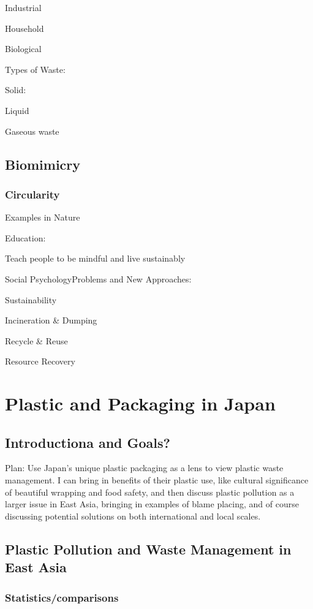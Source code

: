 \documentclass{book}\usepackage{knitr}
\begin{document}
Industrial

Household

Biological 

Types of Waste:

Solid:

Liquid

Gaseous waste

\section{Biomimicry}

\subsection{Circularity}

Examples in Nature

Education:

Teach people to be mindful and live sustainably

Social PsychologyProblems and New Approaches: 

Sustainability

Incineration \& Dumping

Recycle \& Reuse

Resource Recovery


\chapter{Plastic and Packaging in Japan}

\section{Introductiona and Goals?}

Plan: Use Japan's unique plastic packaging as a lens to view plastic waste management. I can bring in benefits of their plastic use, like cultural significance of beautiful wrapping and food safety, and then discuss plastic pollution as a larger issue in East Asia, bringing in examples of blame placing, and of course discussing potential solutions on both international and local scales. 

\section{Plastic Pollution and Waste Management in East Asia} 

\subsection{Statistics/comparisons}
\end{document}
